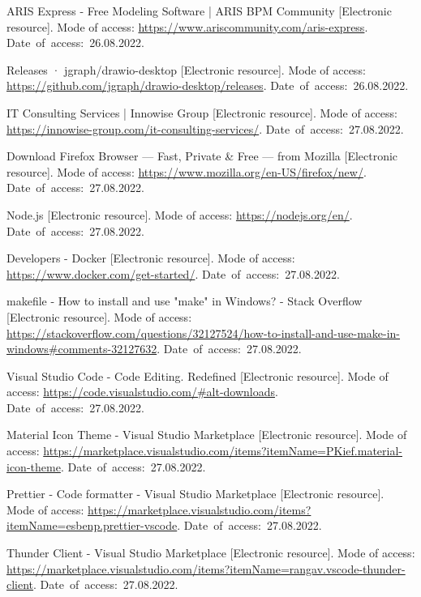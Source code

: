 \begin{thebibliography}{}
    ARIS Express - Free Modeling Software | ARIS BPM Community
    [Electronic resource].
    Mode of access: \url{https://www.ariscommunity.com/aris-express}.
    Date~of~access:~26.08.2022.
  
    Releases · jgraph/drawio-desktop
    [Electronic resource].
    Mode of access: \url{https://github.com/jgraph/drawio-desktop/releases}.
    Date~of~access:~26.08.2022.
  
    IT Consulting Services | Innowise Group
    [Electronic resource].
    Mode of access: \url{https://innowise-group.com/it-consulting-services/}.
    Date~of~access:~27.08.2022.
  
    Download Firefox Browser — Fast, Private \& Free — from Mozilla
    [Electronic resource].
    Mode of access: \url{https://www.mozilla.org/en-US/firefox/new/}.
    Date~of~access:~27.08.2022.
  
    Node.js
    [Electronic resource].
    Mode of access: \url{https://nodejs.org/en/}.
    Date~of~access:~27.08.2022.
    
    Developers - Docker
    [Electronic resource].
    Mode of access: \url{https://www.docker.com/get-started/}.
    Date~of~access:~27.08.2022.
  
    makefile - How to install and use "make" in Windows? - Stack Overflow
    [Electronic resource].
    Mode of access: \url{https://stackoverflow.com/questions/32127524/how-to-install-and-use-make-in-windows#comments-32127632}.
    Date~of~access:~27.08.2022.
  
    Visual Studio Code - Code Editing. Redefined
    [Electronic resource].
    Mode of access: \url{https://code.visualstudio.com/#alt-downloads}.
    Date~of~access:~27.08.2022.
  
    Material Icon Theme - Visual Studio Marketplace
    [Electronic resource].
    Mode of access: \url{https://marketplace.visualstudio.com/items?itemName=PKief.material-icon-theme}.
    Date~of~access:~27.08.2022.
  
    Prettier - Code formatter - Visual Studio Marketplace
    [Electronic resource].
    Mode of access: \url{https://marketplace.visualstudio.com/items?itemName=esbenp.prettier-vscode}.
    Date~of~access:~27.08.2022.
  
    Thunder Client - Visual Studio Marketplace
    [Electronic resource].
    Mode of access: \url{https://marketplace.visualstudio.com/items?itemName=rangav.vscode-thunder-client}.
    Date~of~access:~27.08.2022.
  

\end{thebibliography}
